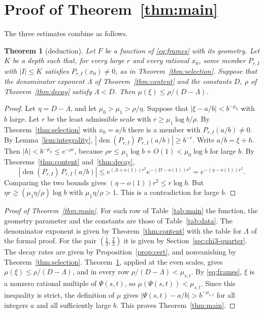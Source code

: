 \documentclass[11pt]{amsart}
\newtheorem{theorem}{Theorem}[section]
\theoremstyle{definition}
\theoremstyle{remark}
\numberwithin{equation}{section}
\newcommand{\den}{\operatorname{den}}
\begin{document}
\section{Proof of Theorem~\ref{thm:main}}\label{sec:proof}

The three estimates combine as follows.

\begin{theorem}[deduction]\label{thm:deduction}
Let $F$ be a function of \eqref{eq:frames} with its geometry. Let $K$ be a depth such that, for every large $r$ and every
rational $x_0$, some member $P_{r,I}$ with $|I|\le K$ satisfies $P_{r,I}(x_0)\ne0$, as in Theorem~\ref{thm:selection}.
Suppose that the denominator exponent $\Lambda$ of Theorem~\ref{thm:content} and the constants $D$, $\rho$ of
Theorem~\ref{thm:decay} satisfy $\Lambda<D$. Then $\mu(\xi)\le\rho/(D-\Lambda)$.
\end{theorem}

\begin{proof}
Let $\eta=D-\Lambda$, and let $\mu_0>\mu_1>\rho/\eta$. Suppose that $|\xi-a/b|<b^{-\mu_0}$ with $b$ large. Let $r$ be
the least admissible scale with $r\ge\mu_1\log b/\rho$. By Theorem~\ref{thm:selection} with $x_0=a/b$ there is a member
with $P_{r,I}(a/b)\ne0$. By Lemma~\ref{lem:integrality}, $|\den(P_{r,I})\,P_{r,I}(a/b)|\ge b^{-r}$. Write $a/b=\xi+h$.
Then $|h|<b^{-\mu_0}\le e^{-\rho r}$, because $\rho r\le\mu_1\log b+O(1)<\mu_0\log b$ for large $b$. By
Theorems~\ref{thm:content} and~\ref{thm:decay},
\[
 |\den(P_{r,I})\,P_{r,I}(a/b)|\le e^{(\Lambda+o(1))r^2}e^{-(D-o(1))r^2}=e^{-(\eta-o(1))r^2}.
\]
Comparing the two bounds gives $(\eta-o(1))r^2\le r\log b$. But $\eta r\ge(\mu_1\eta/\rho)\log b$ with
$\mu_1\eta/\rho>1$. This is a contradiction for large $b$.
\end{proof}

\begin{proof}[Proof of Theorem~\ref{thm:main}]
For each row of Table~\ref{tab:main} the function, the geometry parameter and the constants are those of
Table~\ref{tab:data}. The denominator exponent is given by Theorem~\ref{thm:content} with the table for $\Lambda$ of the formal
proof. For the pair $(\frac13,\frac23)$ it is given by Section~\ref{sec:chi3-quarter}. The decay rates are given by
Proposition~\ref{prop:cert}, and nonvanishing by Theorem~\ref{thm:selection}. Theorem~\ref{thm:deduction}, applied at the even scales, gives
$\mu(\xi)\le\rho/(D-\Lambda)$, and in every row $\rho/(D-\Lambda)<\mu_{s,t}$. By \eqref{eq:frames}, $\xi$ is a
nonzero rational multiple of $\Psi(s,t)$, so $\mu(\Psi(s,t))<\mu_{s,t}$. Since this inequality is strict, the
definition of $\mu$ gives $|\Psi(s,t)-a/b|>b^{-\mu_{s,t}}$ for all integers $a$ and all sufficiently large $b$. This
proves Theorem~\ref{thm:main}.
\end{proof}
\end{document}
